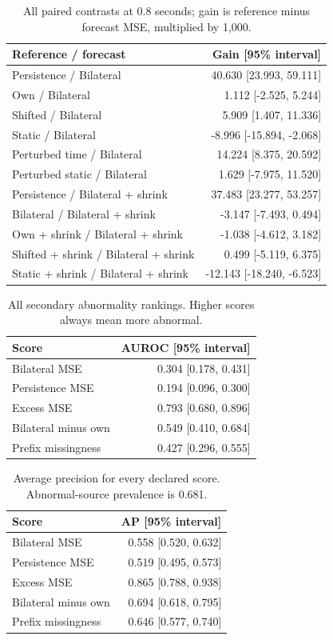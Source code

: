 \documentclass[letterpaper]{article}
\begin{document}
\begin{table}[t]
\centering
\small
\begin{tabular}{lr}
\toprule
Reference / forecast & Gain [95\% interval] \\
\midrule
Persistence / Bilateral & 40.630 [23.993, 59.111] \\
Own / Bilateral & 1.112 [-2.525, 5.244] \\
Shifted / Bilateral & 5.909 [1.407, 11.336] \\
Static / Bilateral & -8.996 [-15.894, -2.068] \\
Perturbed time / Bilateral & 14.224 [8.375, 20.592] \\
Perturbed static / Bilateral & 1.629 [-7.975, 11.520] \\
Persistence / Bilateral + shrink & 37.483 [23.277, 53.257] \\
Bilateral / Bilateral + shrink & -3.147 [-7.493, 0.494] \\
Own + shrink / Bilateral + shrink & -1.038 [-4.612, 3.182] \\
Shifted + shrink / Bilateral + shrink & 0.499 [-5.119, 6.375] \\
Static + shrink / Bilateral + shrink & -12.143 [-18.240, -6.523] \\
\bottomrule
\end{tabular}
\caption{All paired contrasts at 0.8 seconds; gain is reference minus forecast MSE, multiplied by 1,000.}
\end{table}

\begin{table}[t]
\centering
\small
\begin{tabular}{lr}
\toprule
Score & AUROC [95\% interval] \\
\midrule
Bilateral MSE & 0.304 [0.178, 0.431] \\
Persistence MSE & 0.194 [0.096, 0.300] \\
Excess MSE & 0.793 [0.680, 0.896] \\
Bilateral minus own & 0.549 [0.410, 0.684] \\
Prefix missingness & 0.427 [0.296, 0.555] \\
\bottomrule
\end{tabular}
\caption{All secondary abnormality rankings. Higher scores always mean more abnormal.}
\end{table}

\begin{table}[t]
\centering
\small
\begin{tabular}{lr}
\toprule
Score & AP [95\% interval] \\
\midrule
Bilateral MSE & 0.558 [0.520, 0.632] \\
Persistence MSE & 0.519 [0.495, 0.573] \\
Excess MSE & 0.865 [0.788, 0.938] \\
Bilateral minus own & 0.694 [0.618, 0.795] \\
Prefix missingness & 0.646 [0.577, 0.740] \\
\bottomrule
\end{tabular}
\caption{Average precision for every declared score. Abnormal-source prevalence is 0.681.}
\end{table}
\end{document}
